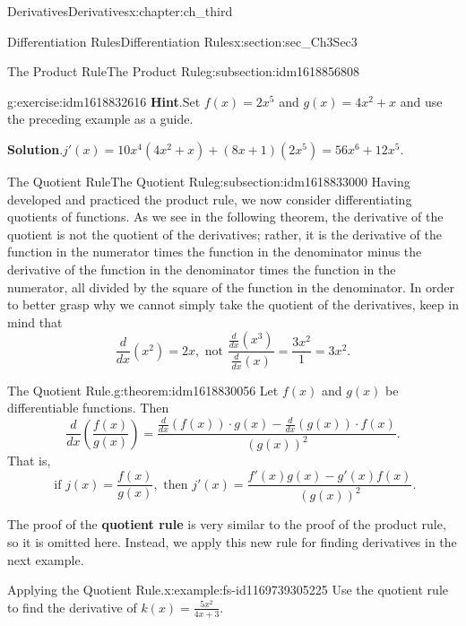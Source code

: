 \documentclass[oneside,10pt,]{book}
\newcommand{\blocktitlefont}{\relax}
\newcommand{\terminology}[1]{\textbf{#1}}
\numberwithin{equation}{section}
\begin{document}
\begin{chapterptx}{Derivatives}{}{Derivatives}{}{}{x:chapter:ch_third}
\begin{sectionptx}{Differentiation Rules}{}{Differentiation Rules}{}{}{x:section:sec_Ch3Sec3}
\begin{subsectionptx}{The Product Rule}{}{The Product Rule}{}{}{g:subsection:idm1618856808}
\begin{inlineexercise}{}{g:exercise:idm1618832616}
\noindent\textbf{\blocktitlefont Hint}.\hypertarget{g:hint:idm1618832872}{}\quad{}Set \(f(x)=2x^5\) and \(g(x)=4x^2+x\) and use the preceding example as a guide.%
\par\smallskip%
\noindent\textbf{\blocktitlefont Solution}.\hypertarget{g:solution:idm1618833768}{}\quad{}\(j'(x)=10x^4(4x^2+x)+(8x+1)(2x^5)=56x^6+12x^5.\)%
\end{inlineexercise}%
\end{subsectionptx}
%
%
\typeout{************************************************}
\typeout{************************************************}
%
\begin{subsectionptx}{The Quotient Rule}{}{The Quotient Rule}{}{}{g:subsection:idm1618833000}
Having developed and practiced the product rule, we now consider differentiating quotients of functions. As we see in the following theorem, the derivative of the quotient is not the quotient of the derivatives; rather, it is the derivative of the function in the numerator times the function in the denominator minus the derivative of the function in the denominator times the function in the numerator, all divided by the square of the function in the denominator. In order to better grasp why we cannot simply take the quotient of the derivatives, keep in mind that%
%
\begin{equation*}
\frac{d}{dx}(x^2)=2x,\text{ not } \frac{\frac{d}{dx}(x^3)}{\frac{d}{dx}(x)}=\frac{3x^2}{1}=3x^2.
\end{equation*}
\begin{theorem}{The Quotient Rule.}{}{g:theorem:idm1618830056}%
Let \(f(x)\) and \(g(x)\) be differentiable functions. Then%
%
\begin{equation*}
\frac{d}{dx}(\frac{f(x)}{g(x)})=\frac{\frac{d}{dx}(f(x))\cdot g(x)-\frac{d}{dx}(g(x))\cdot f(x)}{(g(x))^2}.
\end{equation*}
That is,%
%
\begin{equation*}
\text{ if } j(x)=\frac{f(x)}{g(x)},\text{ then } j'(x)=\frac{f'(x)g(x)-g'(x)f(x)}{(g(x))^2}.
\end{equation*}
\end{theorem}
The proof of the \terminology{quotient rule} is very similar to the proof of the product rule, so it is omitted here. Instead, we apply this new rule for finding derivatives in the next example.%
\begin{example}{Applying the Quotient Rule.}{x:example:fs-id1169739305225}%
Use the quotient rule to find the derivative of \(k(x)=\frac{5x^2}{4x+3}.\)%

\end{example}
\end{subsectionptx}
\end{sectionptx}
\end{chapterptx}
\end{document}
